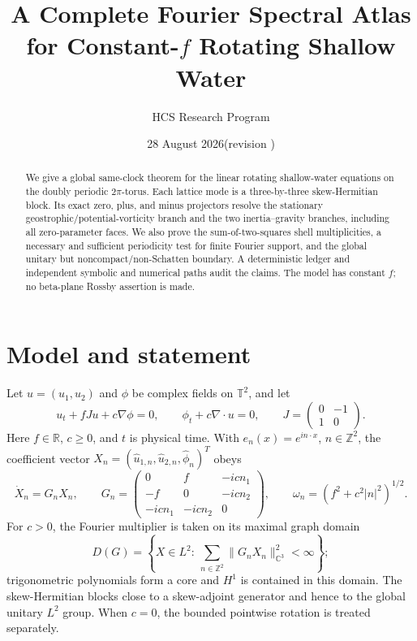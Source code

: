 \documentclass[11pt]{article}
\title{A Complete Fourier Spectral Atlas for Constant-\(f\) Rotating Shallow Water}
\author{HCS Research Program}
\date{28 August 2026\quad (revision \CRevisionRound)}
\begin{document}
\maketitle
\begin{abstract}
We give a global same-clock theorem for the linear rotating shallow-water
equations on the doubly periodic \(2\pi\)-torus.  Each lattice mode is a
three-by-three skew-Hermitian block.  Its exact zero, plus, and minus
projectors resolve the stationary geostrophic/potential-vorticity branch and
the two inertia--gravity branches, including all zero-parameter faces.  We
also prove the sum-of-two-squares shell multiplicities, a necessary and
sufficient periodicity test for finite Fourier support, and the global
unitary but noncompact/non-Schatten boundary.  A deterministic ledger and
independent symbolic and numerical paths audit the claims.  The model has
constant \(f\); no beta-plane Rossby assertion is made.
\end{abstract}

\section{Model and statement}
Let \(u=(u_1,u_2)\) and \(\phi\) be complex fields on \(\mathbb T^2\), and let
\[
 u_t+fJu+c\nabla\phi=0,\qquad
 \phi_t+c\nabla\!\cdot u=0,\qquad
 J=\begin{pmatrix}0&-1\\1&0\end{pmatrix}.
\]
Here \(f\in\mathbb R\), \(c\geq0\), and \(t\) is physical time.  With
\(e_n(x)=e^{i n\cdot x}\), \(n\in\mathbb Z^2\), the coefficient vector
\(X_n=(\widehat u_{1,n},\widehat u_{2,n},\widehat\phi_n)^T\) obeys
\[
 \dot X_n=G_nX_n,\qquad
 G_n=\begin{pmatrix}
 0&f&-icn_1\\[-1mm]-f&0&-icn_2\\[-1mm]
 -icn_1&-icn_2&0
 \end{pmatrix},\qquad
 \omega_n=(f^2+c^2|n|^2)^{1/2}.
\]
For \(c>0\), the Fourier multiplier is taken on its maximal graph domain
\[
D(G)=\left\{X\in L^2:\ \sum_{n\in\mathbb Z^2}\|G_nX_n\|_{\mathbb C^3}^2<\infty\right\};
\]
trigonometric polynomials form a core and \(H^1\) is contained in this domain.
The skew-Hermitian blocks close to a skew-adjoint generator and hence to the
global unitary \(L^2\) group.  When \(c=0\), the bounded pointwise rotation is
treated separately.
\end{document}
